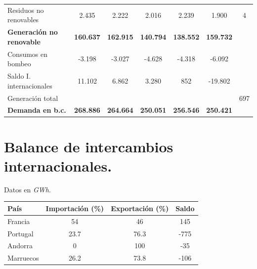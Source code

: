 \begin{table}[H]
\begin{tabular}{l|cccccc}
			Residuos no renovables &  2.435 &  2.222 &   2.016 &   2.239 &   1.900 & 4\\
			\textbf{Generación no renovable} & \textbf{160.637} & \textbf{162.915} & \textbf{140.794} & \textbf{138.552} & \textbf{159.732} & \\
			Consumos en bombeo    &  -3.198 & -3.027 &  -4.628 &  -4.318 &  -6.092 & \\
			Saldo I. internacionales & 11.102 &  6.862 &   3.280 &   852   & -19.802 & \\
			Generación total	  &&&&&&697\\
			\hline
			\textbf{Demanda en b.c.}       & \textbf{268.886} & \textbf{264.664} & \textbf{250.051} & \textbf{256.546} & \textbf{250.421} &\\
		\end{tabular}
	\end{table}

\section{Balance de intercambios internacionales.}
	Datos en \textit{GWh}.
	\begin{table}[H]
		\centering
		\begin{tabular}{lccc}
			\toprule
			\textbf{País} & \textbf{Importación (\%)} & \textbf{Exportación (\%)} & \textbf{Saldo} \\
			\midrule
			Francia & 54 & 46 & 145 \\
			Portugal & 23.7 & 76.3 & -775 \\
			Andorra & 0 & 100 & -35 \\
			Marruecos & 26.2 & 73.8 & -106 \\
			\bottomrule
		\end{tabular}
	\end{table}
	
